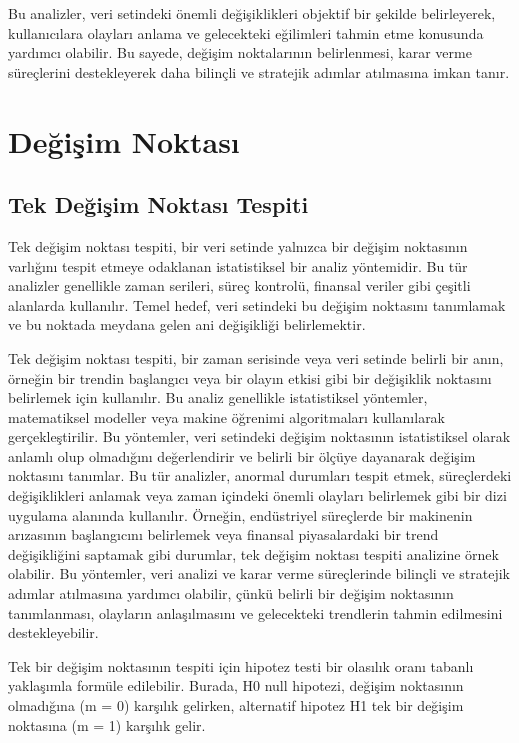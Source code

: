 \documentclass[12pt,twoside]{deuthesis}
\begin{document}
Bu analizler, veri setindeki önemli değişiklikleri objektif bir şekilde belirleyerek, kullanıcılara olayları anlama ve gelecekteki eğilimleri tahmin etme konusunda yardımcı olabilir. Bu sayede, değişim noktalarının belirlenmesi, karar verme süreçlerini destekleyerek daha bilinçli ve stratejik adımlar atılmasına imkan tanır.

\hypertarget{Bolum2}{%
\chapter{Değişim Noktası}\label{Bolum2}}

\hypertarget{tek-deux11fiux15fim-noktasux131-tespiti}{%
\section{Tek Değişim Noktası Tespiti}\label{tek-deux11fiux15fim-noktasux131-tespiti}}

Tek değişim noktası tespiti, bir veri setinde yalnızca bir değişim noktasının varlığını tespit etmeye odaklanan istatistiksel bir analiz yöntemidir. Bu tür analizler genellikle zaman serileri, süreç kontrolü, finansal veriler gibi çeşitli alanlarda kullanılır. Temel hedef, veri setindeki bu değişim noktasını tanımlamak ve bu noktada meydana gelen ani değişikliği belirlemektir.

Tek değişim noktası tespiti, bir zaman serisinde veya veri setinde belirli bir anın, örneğin bir trendin başlangıcı veya bir olayın etkisi gibi bir değişiklik noktasını belirlemek için kullanılır. Bu analiz genellikle istatistiksel yöntemler, matematiksel modeller veya makine öğrenimi algoritmaları kullanılarak gerçekleştirilir. Bu yöntemler, veri setindeki değişim noktasının istatistiksel olarak anlamlı olup olmadığını değerlendirir ve belirli bir ölçüye dayanarak değişim noktasını tanımlar. Bu tür analizler, anormal durumları tespit etmek, süreçlerdeki değişiklikleri anlamak veya zaman içindeki önemli olayları belirlemek gibi bir dizi uygulama alanında kullanılır. Örneğin, endüstriyel süreçlerde bir makinenin arızasının başlangıcını belirlemek veya finansal piyasalardaki bir trend değişikliğini saptamak gibi durumlar, tek değişim noktası tespiti analizine örnek olabilir. Bu yöntemler, veri analizi ve karar verme süreçlerinde bilinçli ve stratejik adımlar atılmasına yardımcı olabilir, çünkü belirli bir değişim noktasının tanımlanması, olayların anlaşılmasını ve gelecekteki trendlerin tahmin edilmesini destekleyebilir.

Tek bir değişim noktasının tespiti için hipotez testi bir olasılık oranı tabanlı yaklaşımla formüle edilebilir. Burada, H0 null hipotezi, değişim noktasının olmadığına (m = 0) karşılık gelirken, alternatif hipotez H1 tek bir değişim noktasına (m = 1) karşılık gelir.
\end{document}
